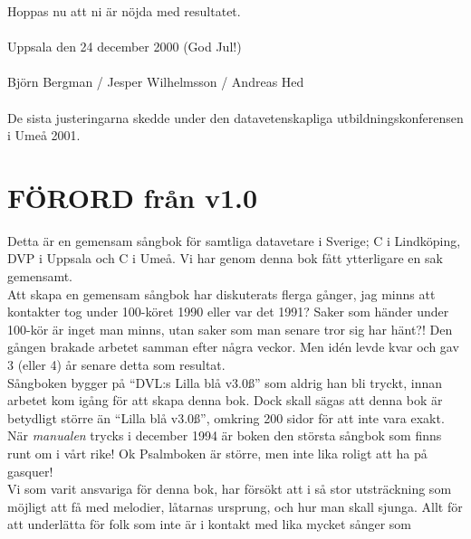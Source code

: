 \documentclass[a6paper,fontsize=10pt,twoside,open=right]{scrbook}
\begin{document}
\vspace{10pt}
\noindent Hoppas nu att ni är nöjda med
resultatet.\\ \\ Uppsala den 24 december 2000 (God Jul!)\\ \\ Björn
Bergman / Jesper Wilhelmsson / Andreas Hed\\ \\ De sista justeringarna
skedde under den datavetenskapliga utbildningskonferensen i Umeå 2001.
\cleardoublepage
\section{FÖRORD från v1.0}\vspace{10pt}
\hspace{10pt}Detta är en gemensam sångbok för samtliga datavetare
i Sverige; C i Lindköping, DVP i Uppsala och C i Umeå. Vi har genom
denna bok fått ytterligare en sak gemensamt.\\ \indent Att skapa en
gemensam sångbok har diskuterats flerga gånger, jag minns att
kontakter tog under 100-köret 1990 eller var det 1991?  Saker som
händer under 100-kör är inget man minns, utan saker som man senare
tror sig har hänt?! Den gången brakade arbetet samman efter några
veckor. Men idén levde kvar och gav 3 (eller 4) år senare detta som
resultat.\\ \indent Sångboken bygger på ``DVL:s Lilla blå v3.0\ss''
som aldrig han bli tryckt, innan arbetet kom igång för att skapa denna
bok. Dock skall sägas att denna bok är betydligt större än ``Lilla blå
v3.0\ss'', omkring 200 sidor för att inte vara exakt.\\ \indent När
\textit{manualen} trycks i december 1994 är boken den största sångbok
som finns runt om i vårt rike! Ok Psalmboken är större, men inte lika
roligt att ha på gasquer!\\ \indent Vi som varit ansvariga för denna
bok, har försökt att i så stor utsträckning som möjligt att få med
melodier, låtarnas ursprung, och hur man skall sjunga. Allt för att
underlätta för folk som inte är i kontakt med lika mycket sånger som
\end{document}
